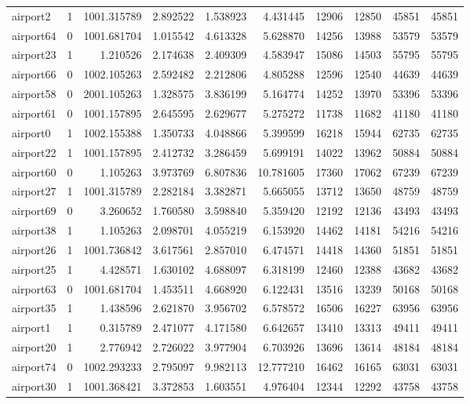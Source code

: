 \begin{longtable}{|l|r|r|r|r|r|r|r|r|r|}
airport2 & 1 & 1001.315789 & 2.892522 & 1.538923 & 4.431445 & 12906 & 12850 & 45851 & 45851 \\
airport64 & 0 & 1001.681704 & 1.015542 & 4.613328 & 5.628870 & 14256 & 13988 & 53579 & 53579 \\
airport23 & 1 & 1.210526 & 2.174638 & 2.409309 & 4.583947 & 15086 & 14503 & 55795 & 55795 \\
airport66 & 0 & 1002.105263 & 2.592482 & 2.212806 & 4.805288 & 12596 & 12540 & 44639 & 44639 \\
airport58 & 0 & 2001.105263 & 1.328575 & 3.836199 & 5.164774 & 14252 & 13970 & 53396 & 53396 \\
airport61 & 0 & 1001.157895 & 2.645595 & 2.629677 & 5.275272 & 11738 & 11682 & 41180 & 41180 \\
airport0 & 1 & 1002.155388 & 1.350733 & 4.048866 & 5.399599 & 16218 & 15944 & 62735 & 62735 \\
airport22 & 1 & 1001.157895 & 2.412732 & 3.286459 & 5.699191 & 14022 & 13962 & 50884 & 50884 \\
airport60 & 0 & 1.105263 & 3.973769 & 6.807836 & 10.781605 & 17360 & 17062 & 67239 & 67239 \\
airport27 & 1 & 1001.315789 & 2.282184 & 3.382871 & 5.665055 & 13712 & 13650 & 48759 & 48759 \\
airport69 & 0 & 3.260652 & 1.760580 & 3.598840 & 5.359420 & 12192 & 12136 & 43493 & 43493 \\
airport38 & 1 & 1.105263 & 2.098701 & 4.055219 & 6.153920 & 14462 & 14181 & 54216 & 54216 \\
airport26 & 1 & 1001.736842 & 3.617561 & 2.857010 & 6.474571 & 14418 & 14360 & 51851 & 51851 \\
airport25 & 1 & 4.428571 & 1.630102 & 4.688097 & 6.318199 & 12460 & 12388 & 43682 & 43682 \\
airport63 & 0 & 1001.681704 & 1.453511 & 4.668920 & 6.122431 & 13516 & 13239 & 50168 & 50168 \\
airport35 & 1 & 1.438596 & 2.621870 & 3.956702 & 6.578572 & 16506 & 16227 & 63956 & 63956 \\
airport1 & 1 & 0.315789 & 2.471077 & 4.171580 & 6.642657 & 13410 & 13313 & 49411 & 49411 \\
airport20 & 1 & 2.776942 & 2.726022 & 3.977904 & 6.703926 & 13696 & 13614 & 48184 & 48184 \\
airport74 & 0 & 1002.293233 & 2.795097 & 9.982113 & 12.777210 & 16462 & 16165 & 63031 & 63031 \\
airport30 & 1 & 1001.368421 & 3.372853 & 1.603551 & 4.976404 & 12344 & 12292 & 43758 & 43758 \\

\end{longtable}
